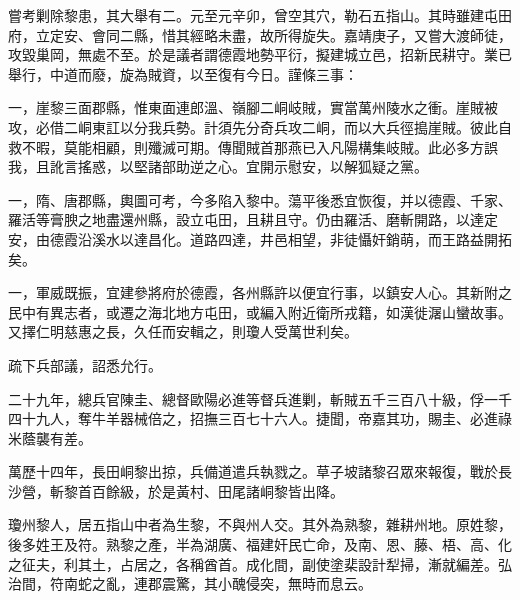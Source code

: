 \begin{pinyinscope}
嘗考剿除黎患，其大舉有二。元至元辛卯，曾空其穴，勒石五指山。其時雖建屯田府，立定安、會同二縣，惜其經略未盡，故所得旋失。嘉靖庚子，又嘗大渡師徒，攻毀巢岡，無處不至。於是議者謂德霞地勢平衍，擬建城立邑，招新民耕守。業已舉行，中道而廢，旋為賊資，以至復有今日。謹條三事：

一，崖黎三面郡縣，惟東面連郎溫、嶺腳二峒岐賊，實當萬州陵水之衝。崖賊被攻，必借二峒東訌以分我兵勢。計須先分奇兵攻二峒，而以大兵徑搗崖賊。彼此自救不暇，莫能相顧，則殲滅可期。傳聞賊首那燕已入凡陽構集岐賊。此必多方誤我，且訛言搖惑，以堅諸部助逆之心。宜開示慰安，以解狐疑之黨。

一，隋、唐郡縣，輿圖可考，今多陷入黎中。蕩平後悉宜恢復，并以德霞、千家、羅活等膏腴之地盡還州縣，設立屯田，且耕且守。仍由羅活、磨斬開路，以達定安，由德霞沿溪水以達昌化。道路四達，井邑相望，非徒懾奸銷萌，而王路益開拓矣。

一，軍威既振，宜建參將府於德霞，各州縣許以便宜行事，以鎮安人心。其新附之民中有異志者，或遷之海北地方屯田，或編入附近衛所戎籍，如漢徙潳山蠻故事。又擇仁明慈惠之長，久任而安輯之，則瓊人受萬世利矣。

疏下兵部議，詔悉允行。

二十九年，總兵官陳圭、總督歐陽必進等督兵進剿，斬賊五千三百八十級，俘一千四十九人，奪牛羊器械倍之，招撫三百七十六人。捷聞，帝嘉其功，賜圭、必進祿米蔭襲有差。

萬歷十四年，長田峒黎出掠，兵備道遣兵執戮之。草子坡諸黎召眾來報復，戰於長沙營，斬黎首百餘級，於是黃村、田尾諸峒黎皆出降。

瓊州黎人，居五指山中者為生黎，不與州人交。其外為熟黎，雜耕州地。原姓黎，後多姓王及符。熟黎之產，半為湖廣、福建奸民亡命，及南、恩、藤、梧、高、化之征夫，利其土，占居之，各稱酋首。成化間，副使塗棐設計犁掃，漸就編差。弘治間，符南蛇之亂，連郡震驚，其小醜侵突，無時而息云。


\end{pinyinscope}